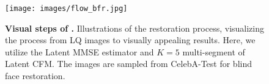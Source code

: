 \begin{figure}[H]
\centering
\hspace*{0.0cm}\texttt{[image: images/flow\_bfr.jpg]}
\caption{\textbf{Visual steps of \name.} Illustrations of the restoration process, visualizing the process from LQ images to visually appealing results. Here, we utilize the Latent MMSE estimator and $K=5$ multi-segment of Latent CFM. The images are sampled from CelebA-Test for blind face restoration.}
\label{fig:flow_bfr}
\end{figure}


















